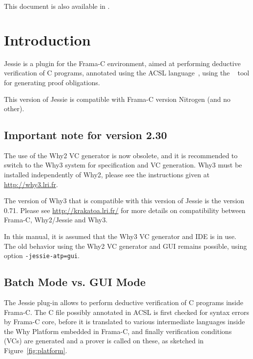 \documentclass[a4paper,11pt,twoside,openright]{report}
\begin{document}
\ifhevea%
This document is also available in .
\else
\sloppy
{}
\fi


\tableofcontents

\chapter{Introduction}

Jessie is a plugin for the Frama-C environment, aimed at performing
deductive verification of C programs, annotated using the ACSL
language~\cite{baudin09acsl}, using the \Why{}~\cite{why} tool for
generating proof obligations.

This version \whyversion{} of Jessie is compatible with Frama-C version
Nitrogen (and no other).

\section{Important note for version 2.30}

The use of the Why2 VC generator is now obsolete, and it is
recommended to switch to the Why3 system for specification and VC
generation. Why3 must be installed independently of Why2, please see the
instructions given at \url{http://why3.lri.fr}.

The version of Why3 that is compatible with this version \whyversion{} of Jessie
is the version 0.71. Please see \url{http://krakatoa.lri.fr/} for more
details on compatibility between Frama-C, Why2/Jessie and Why3.

In this manual, it is assumed that the Why3 VC generator and IDE is in
use.  The old behavior using the Why2 VC generator and GUI remains
possible, using option \texttt{-jessie-atp=gui}.

\section{Batch Mode vs. GUI Mode}

The Jessie plug-in allows to perform deductive verification of C
programs inside Frama-C. The C file possibly annotated in ACSL is
first checked for syntax errors by Frama-C core, before it is
translated to various intermediate languages inside the Why Platform
embedded in Frama-C, and finally verification conditions (VCs) are
generated and a prover is called on these, as sketched in
Figure~\ref{fig:platform}.
\end{document}
